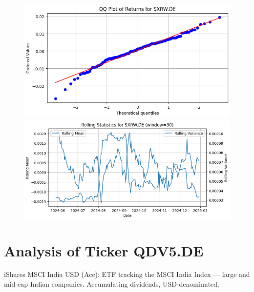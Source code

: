 \documentclass{article}%
\begin{document}
%


\begin{figure}[htbp]%
\begin{minipage}{0.48\textwidth}%
\includegraphics[width=\linewidth]{ticker_images/SXRW.DE_qq_plot.png}%
\end{minipage}%
\begin{minipage}{0.48\textwidth}%
\includegraphics[width=\linewidth]{ticker_images/SXRW.DE_rolling_stats.png}%
\end{minipage}%
\end{figure}

%
\section*{Analysis of Ticker QDV5.DE}%
\label{sec:AnalysisofTickerQDV5.DE}%
iShares MSCI India USD (Acc): ETF tracking the MSCI India Index — large and mid‑cap Indian companies. Accumulating dividends, USD‑denominated.%
\end{document}
